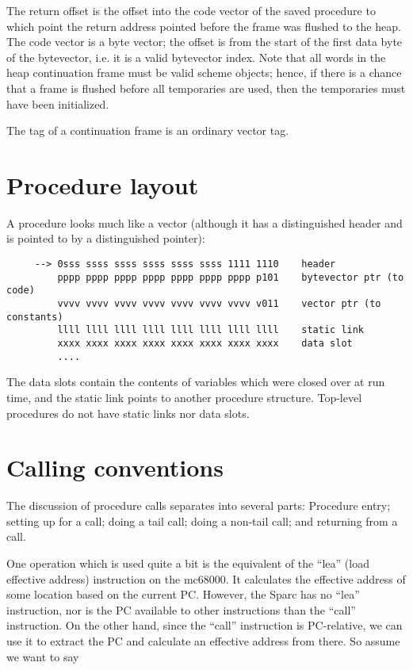 The return offset is the offset into the code vector of the saved
procedure to which point the return address pointed before the frame
was flushed to the heap. The code vector is a byte vector; the offset
is from the start of the first data byte of the bytevector, i.e. it is
a valid bytevector index.  Note that all words in the heap
continuation frame must be valid scheme objects; hence, if there is a
chance that a frame is flushed before all temporaries are used, then
the temporaries must have been initialized.

The tag of a continuation frame is an ordinary vector tag.

\section{Procedure layout}

A procedure looks much like a vector (although it has a distinguished
header and is pointed to by a distinguished pointer):

\begin{minipage}{\linewidth}
\begin{verbatim}
     --> 0sss ssss ssss ssss ssss ssss 1111 1110    header
         pppp pppp pppp pppp pppp pppp pppp p101    bytevector ptr (to code)
         vvvv vvvv vvvv vvvv vvvv vvvv vvvv v011    vector ptr (to constants)
         llll llll llll llll llll llll llll llll    static link
         xxxx xxxx xxxx xxxx xxxx xxxx xxxx xxxx    data slot
         ....
\end{verbatim}
\end{minipage}

The data slots contain the contents of variables which were closed
over at run time, and the static link points to another procedure
structure. Top-level procedures do not have static links nor data slots.


\section{Calling conventions}

The discussion of procedure calls separates into several parts:
Procedure entry; setting up for a call; doing a tail call; doing a
non-tail call; and returning from a call. 

One operation which is used quite a bit is the equivalent of the ``lea''
(load effective address) instruction on the mc68000. It calculates the
effective address of some location based on the current PC.  However,
the Sparc has no ``lea'' instruction, nor is the PC available to other
instructions than the ``call'' instruction. On the other hand, since the
``call'' instruction is PC-relative, we can use it to extract the PC and
calculate an effective address from there. So assume we want to say

